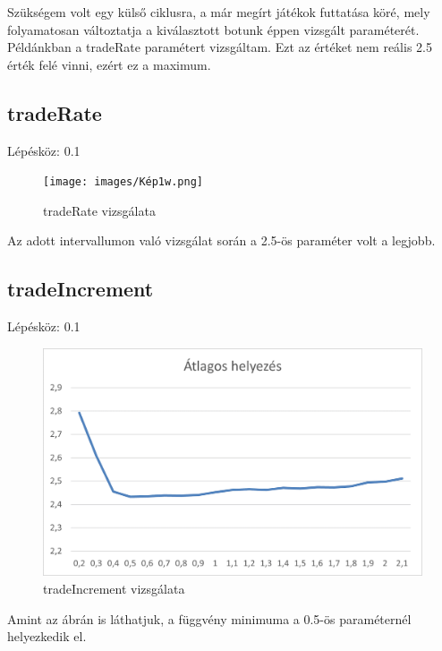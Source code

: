 Szükségem volt egy külső ciklusra, a már megírt játékok futtatása köré, mely folyamatosan változtatja a kiválasztott botunk éppen vizsgált paraméterét. Példánkban a tradeRate paramétert vizsgáltam. Ezt az értéket nem reális 2.5 érték felé vinni, ezért ez a maximum.
\newpage
\subsection{tradeRate}
Lépésköz: 0.1
\begin{figure}[h!]
\centering
\texttt{[image: images/Kép1w.png]}
\caption{tradeRate vizsgálata}
\label{fig:ff}
\end{figure}

Az adott intervallumon való vizsgálat során a 2.5-ös paraméter volt a legjobb.

\subsection{tradeIncrement}
Lépésköz: 0.1
\begin{figure}[h!]
\centering
\includegraphics[scale=0.2]{images/sdf.png}
\caption{tradeIncrement vizsgálata}
\label{fig:ff}
\end{figure}

Amint az ábrán is láthatjuk, a függvény minimuma a 0.5-ös paraméternél helyezkedik el.
\newpage

